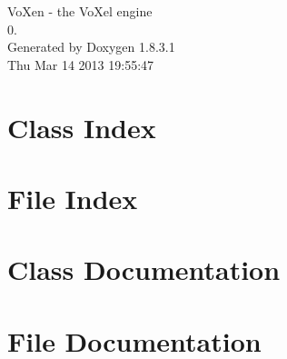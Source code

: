 \documentclass{book}
\begin{document}
\hypersetup{pageanchor=false,citecolor=blue}
\begin{titlepage}
\vspace*{7cm}
\begin{center}
{\Large Vo\-Xen -\/ the Vo\-Xel engine \\[1ex]\large 0. }\\
\vspace*{1cm}
{\large Generated by Doxygen 1.8.3.1}\\
\vspace*{0.5cm}
{\small Thu Mar 14 2013 19:55:47}\\
\end{center}
\end{titlepage}
\clearemptydoublepage
{}
\tableofcontents
\clearemptydoublepage
{}
\hypersetup{pageanchor=true,citecolor=blue}
\chapter{Class Index}

\chapter{File Index}

\chapter{Class Documentation}







































\chapter{File Documentation}












\printindex
\end{document}
